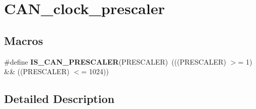 \hypertarget{group___c_a_n__clock__prescaler}{\section{C\-A\-N\-\_\-clock\-\_\-prescaler}
\label{group___c_a_n__clock__prescaler}
}
\subsection*{Macros}
\begin{DoxyCompactItemize}
\item 
\hypertarget{group___c_a_n__clock__prescaler_gacde6b8be6fe083a6302fc183b5ac1055}{\#define {\bfseries I\-S\-\_\-\-C\-A\-N\-\_\-\-P\-R\-E\-S\-C\-A\-L\-E\-R}(P\-R\-E\-S\-C\-A\-L\-E\-R)~(((P\-R\-E\-S\-C\-A\-L\-E\-R) $>$= 1) \&\& ((P\-R\-E\-S\-C\-A\-L\-E\-R) $<$= 1024))}\label{group___c_a_n__clock__prescaler_gacde6b8be6fe083a6302fc183b5ac1055}

\end{DoxyCompactItemize}


\subsection{Detailed Description}
